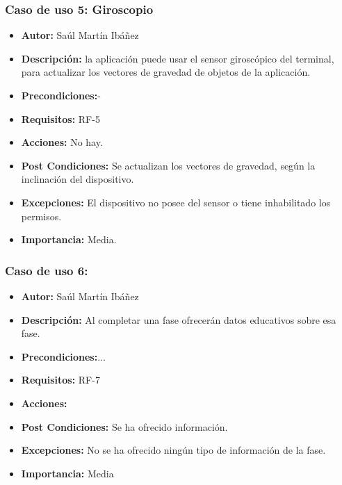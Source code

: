 \subsubsection{Caso de uso 5: Giroscopio}
\begin{itemize}
	\item \textbf{Autor:} Saúl Martín Ibáñez
	\item \textbf{Descripción:} la aplicación puede usar el sensor giroscópico del terminal, para actualizar los vectores de gravedad de objetos de la aplicación.
	\item \textbf{Precondiciones:}-
	\item \textbf{Requisitos:} RF-5
	\item \textbf{Acciones:} No hay.
	\item \textbf{Post Condiciones:} Se actualizan los vectores de gravedad, según la inclinación del dispositivo.
	\item \textbf{Excepciones:} El dispositivo no posee del sensor o tiene inhabilitado los permisos.
	\item \textbf{Importancia:} Media.
\end{itemize}
\subsubsection{Caso de uso 6: }
 \begin{itemize}
 	\item \textbf{Autor:} Saúl Martín Ibáñez
 	\item \textbf{Descripción:} Al completar una fase ofrecerán datos educativos sobre esa fase. 
 	\item \textbf{Precondiciones:}...
 	\item \textbf{Requisitos:} RF-7
 	\item \textbf{Acciones:}
 	\item \textbf{Post Condiciones:} Se ha ofrecido información.
 	\item \textbf{Excepciones:} No se ha ofrecido ningún tipo de información de la fase.
 	\item \textbf{Importancia:} Media
 \end{itemize}
